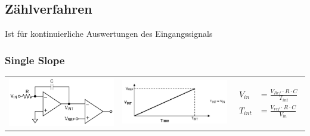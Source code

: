 \subsection{Zählverfahren } 
Ist für kontinuierliche Auswertungen des Eingangssignals
\subsubsection{Single Slope}

\begin{tabular}{ccp{4cm}}
  \includegraphics[width=5cm, valign=t]{images/singleSlope1} &
  \includegraphics[width=5cm, valign=t]{images/singleSlope2} &
  {\begin{align*}
    V_{in}&=\frac{V_{Ref} \cdot R \cdot C}{T_{int}}\\
    T_{int} &= \frac{V_{ref} \cdot R\cdot C}{V_{in}}
  \end{align*}} \\
\end{tabular}

